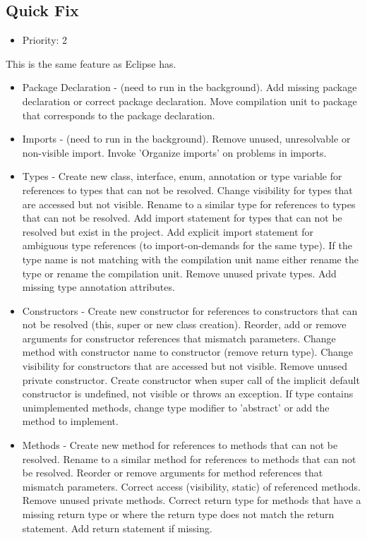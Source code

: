 \subsection{Quick Fix}
\begin{itemize}
	\item Priority: 2
\end{itemize}
This is the same feature as Eclipse has.
\begin{itemize}
	\item Package Declaration - (need to run in the background). Add missing package declaration or correct package declaration. Move compilation unit to package that corresponds to the package declaration.
	\item Imports - (need to run in the background). Remove unused, unresolvable or non-visible import. Invoke 'Organize imports' on problems in imports.
	\item Types - Create new class, interface, enum, annotation or type variable for references to types that can not be resolved. Change visibility for types that are accessed but not visible. Rename to a similar type for references to types that can not be resolved. Add import statement for types that can not be resolved but exist in the project. Add explicit import statement for ambiguous type references (to import-on-demands for the same type). If the type name is not matching with the compilation unit name either rename the type or rename the compilation unit. Remove unused private types. Add missing type annotation attributes.
	\item Constructors - Create new constructor for references to constructors that can not be resolved (this, super or new class creation). Reorder, add or remove arguments for constructor references that mismatch parameters. Change method with constructor name to constructor (remove return type). Change visibility for constructors that are accessed but not visible. Remove unused private constructor. Create constructor when super call of the implicit default constructor is undefined, not visible or throws an exception. If type contains unimplemented methods, change type modifier to 'abstract' or add the method to implement.
	\item Methods - Create new method for references to methods that can not be resolved. Rename to a similar method for references to methods that can not be resolved. Reorder or remove arguments for method references that mismatch parameters. Correct access (visibility, static) of referenced methods. Remove unused private methods. Correct return type for methods that have a missing return type or where the return type does not match the return statement. Add return statement if missing.

\end{itemize}
